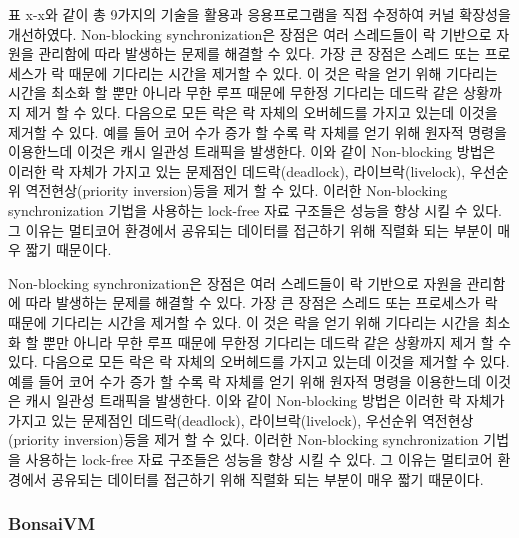 표 x-x와 같이 총 9가지의 기술을 활용과 응용프로그램을 직접 수정하여 커널 확장성을 개선하였다.
Non-blocking synchronization은 장점은 여러 스레드들이 락 기반으로 자원을 관리함에 따라
 발생하는 문제를 해결할 수 있다. 
가장 큰 장점은 스레드 또는 프로세스가 락 때문에 기다리는 시간을 제거할 수 있다.
이 것은 락을 얻기 위해 기다리는 시간을 최소화 할 뿐만 아니라 무한 루프 때문에 무한정 기다리는 
데드락 같은 상황까지 제거 할 수 있다. 
다음으로 모든 락은 락 자체의 오버헤드를 가지고 있는데 이것을 제거할 수 있다. 
예를 들어 코어 수가 증가 할 수록 락 자체를 얻기 위해 원자적 명령을 이용한느데 이것은 캐시 일관성 트래픽을 
발생한다. 
이와 같이 Non-blocking 방법은 이러한 락 자체가 가지고 있는 문제점인 데드락(deadlock), 라이브락(livelock), 
우선순위 역전현상(priority inversion)등을 제거 할 수 있다. 
이러한 Non-blocking synchronization 기법을 사용하는 lock-free 자료 구조들은 성능을 향상 시킬 수 있다. 
그 이유는 멀티코어 환경에서 공유되는 데이터를 접근하기 위해 직렬화 되는 부분이 매우 짧기 때문이다. 


Non-blocking synchronization은 장점은 여러 스레드들이 락 기반으로 자원을 관리함에 따라
 발생하는 문제를 해결할 수 있다. 
가장 큰 장점은 스레드 또는 프로세스가 락 때문에 기다리는 시간을 제거할 수 있다.
이 것은 락을 얻기 위해 기다리는 시간을 최소화 할 뿐만 아니라 무한 루프 때문에 무한정 기다리는 
데드락 같은 상황까지 제거 할 수 있다. 
다음으로 모든 락은 락 자체의 오버헤드를 가지고 있는데 이것을 제거할 수 있다. 
예를 들어 코어 수가 증가 할 수록 락 자체를 얻기 위해 원자적 명령을 이용한느데 이것은 캐시 일관성 트래픽을 
발생한다. 
이와 같이 Non-blocking 방법은 이러한 락 자체가 가지고 있는 문제점인 데드락(deadlock), 라이브락(livelock), 
우선순위 역전현상(priority inversion)등을 제거 할 수 있다. 
이러한 Non-blocking synchronization 기법을 사용하는 lock-free 자료 구조들은 성능을 향상 시킬 수 있다. 
그 이유는 멀티코어 환경에서 공유되는 데이터를 접근하기 위해 직렬화 되는 부분이 매우 짧기 때문이다. 

\subsubsection{BonsaiVM}


